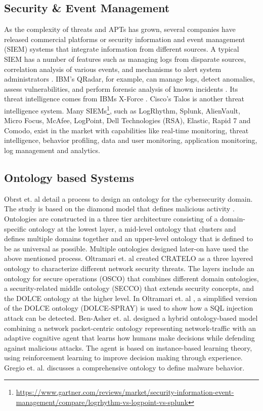 \label{sec:RelatedWork}
\subsection{Security \& Event Management}
As the complexity of threats and APTs has grown, several companies have released commercial platforms or security information and event management (SIEM) systems that integrate information from different sources. A typical SIEM has a number of features such as managing logs from disparate sources, correlation analysis of various events, and mechanisms to alert system administrators \cite{swift2006practical}. IBM's QRadar, for example, can manage logs, detect anomalies, assess vulnerabilities,  and perform forensic analysis of known incidents \cite{qradar}. Its threat intelligence comes from IBMs X-Force \cite{nicolett2017magic}. Cisco's Talos \cite{talos} is another threat intelligence system. Many SIEMs\footnote{\url{https://www.gartner.com/reviews/market/security-information-event-management/compare/logrhythm-vs-logpoint-vs-splunk}}, such as LogRhythm, Splunk, AlienVault, Micro Focus, McAfee, LogPoint, Dell Technologies (RSA), Elastic, Rapid 7 and Comodo, exist in the market with capabilities like real-time monitoring, threat intelligence, behavior profiling, data and user monitoring, application monitoring, log management and analytics. 

\subsection{Ontology based Systems}

Obrst et. al \cite{obrst2012developing} detail a process to design an ontology for the cybersecurity domain. The study is based on the diamond model that defines malicious activity \cite{ingle2010organizing}. Ontologies are constructed in a three tier architecture consisting of a domain-specific ontology at the lowest layer, a mid-level ontology that clusters and defines multiple domains together and an upper-level ontology that is defined to be as universal as possible. Multiple ontologies designed later-on have used the above mentioned process. Oltramari et. al \cite{oltramari2015computational} created CRATELO as a three layered ontology to characterize different network security threats. The layers include an ontology for secure operations (OSCO) that combines different domain ontologies, a security-related middle ontology (SECCO) that extends security concepts, and the DOLCE ontology \cite{masolo2002wonderweb} at the higher level. In Oltramari et. al \cite{oltramari2014building}, a simplified version of the DOLCE ontology (DOLCE-SPRAY) is used to show how a SQL injection attack can be detected. Ben-Asher et. al. \cite{ben2015ontology} designed a hybrid ontology-based model combining a network packet-centric ontology representing network-traffic with an adaptive cognitive agent that learns how humans make decisions while defending against malicious attacks. The agent is based on instance-based learning theory, using reinforcement learning to improve decision making through experience.
Gregio et. al. \cite{gregio2014ontology} discusses a comprehensive ontology to define malware behavior.

